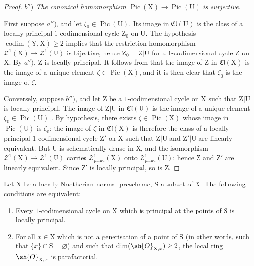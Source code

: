 \begin{proof}
\emph{$b'')$ The canonical homomorphism $\operatorname{Pic}(\mathrm{X})\to\operatorname{Pic}(\mathrm{U})$ is surjective.}

First suppose $a'')$, and let $\zeta_0\in\operatorname{Pic}(\mathrm{U})$. Its image in $\mathfrak{Cl}(\mathrm{U})$  is the class of a locally principal $1$-codimensional cycle $\mathrm{Z}_0$ on $\mathrm{U}$. The hypothesis $\operatorname{codim}(\mathrm{Y},\mathrm{X})\geq 2$ implies that the restriction homomorphism $\mathscr{Z}^1(\mathrm{X})\to\mathscr{Z}^1(\mathrm{U})$ is bijective; hence $\mathrm{Z}_0=\mathrm{Z}|\mathrm{U}$ for a $1$-codimensional cycle $\mathrm{Z}$ on $\mathrm{X}$. By $a'')$, $\mathrm{Z}$ is locally principal. It follows from  that the image of $\mathrm{Z}$ in $\mathfrak{Cl}(\mathrm{X})$ is the image of a unique element $\zeta\in\operatorname{Pic}(\mathrm{X})$, and it is then clear that $\zeta_0$ is the image of $\zeta$.

Conversely, suppose $b'')$, and let $\mathrm{Z}$ be a $1$-codimensional cycle on $\mathrm{X}$ such that $\mathrm{Z}|\mathrm{U}$ is locally principal. The image of $\mathrm{Z}|\mathrm{U}$ in $\mathfrak{Cl}(\mathrm{U})$ is the image of a unique element $\zeta_0\in\operatorname{Pic}(\mathrm{U})$ . By hypothesis, there exists $\zeta\in\operatorname{Pic}(\mathrm{X})$ whose image in $\operatorname{Pic}(\mathrm{U})$ is $\zeta_0$; the image of $\zeta$ in $\mathfrak{Cl}(\mathrm{X})$ is therefore the class of a locally principal $1$-codimensional cycle $\mathrm{Z}'$ on $\mathrm{X}$ such that $\mathrm{Z}|\mathrm{U}$ and $\mathrm{Z}'|\mathrm{U}$ are linearly equivalent. But $\mathrm{U}$ is schematically dense in $\mathrm{X}$, and the isomorphism $\mathscr{Z}^1(\mathrm{X})\to\mathscr{Z}^1(\mathrm{U})$ carries $\mathscr{Z}_{\mathrm{princ}}^1(\mathrm{X})$ onto $\mathscr{Z}_{\mathrm{princ}}^1(\mathrm{U})$; hence $\mathrm{Z}$ and $\mathrm{Z}'$ are linearly equivalent. Since $\mathrm{Z}'$ is locally principal, so is $\mathrm{Z}$.
\end{proof}

\begin{corollary}[21.13.15]
\label{IV.21.13.15}
Let $\mathrm{X}$ be a locally Noetherian normal prescheme, $\mathrm{S}$ a subset of $\mathrm{X}$.
The following conditions are equivalent:
\begin{enumerate}[label=\emph{\alph*)}]
  \item Every $1$-codimensional cycle on $\mathrm{X}$ which is principal at the points of $\mathrm{S}$ is locally principal.
  \item For all $x\in\mathrm{X}$ which is not a generisation of a point of $\mathrm{S}$ (in other words, such that $\overline{\{x\}}\cap\mathrm{S}=\varnothing$) and such that $\dim(\sh{O}_{\mathrm{X},x})\geq 2$, the local ring $\sh{O}_{\mathrm{X},x}$ is parafactorial.
\end{enumerate}
\end{corollary}

